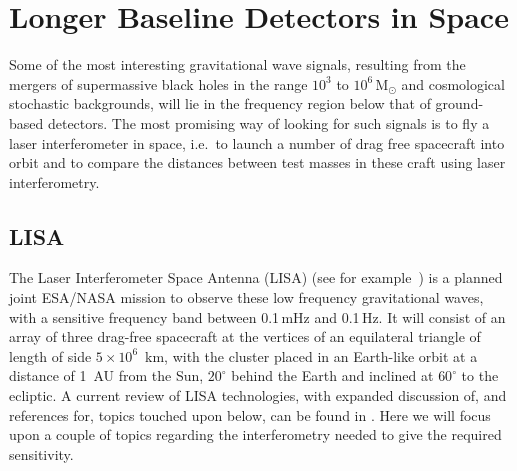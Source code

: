 \documentclass{article}
\begin{document}

\newpage

\section{Longer Baseline Detectors in Space}
\label{section:space}

Some of the most interesting gravitational wave signals, resulting from the
mergers of supermassive black holes in the range $10^3$ to $10^6$\,M$_{\odot}$
and cosmological stochastic backgrounds, will lie in the frequency region below
that of ground-based detectors. The most promising way of looking for such
signals is to fly a laser interferometer in space, i.e.\ to launch a number of
drag free spacecraft into orbit and to compare the distances between test
masses in these craft using laser interferometry.

\subsection{LISA}
The Laser Interferometer Space Antenna (LISA) (see for example~\cite{LISAsymposium,
NASAweb, ESAweb}) is a planned joint ESA/NASA mission to observe these low frequency
gravitational waves, with a sensitive frequency band between 0.1\,mHz and
0.1\,Hz. It will consist of an array of three drag-free spacecraft at the vertices
of an equilateral triangle of length of side $5\times10^6$~km, with the cluster 
placed in an Earth-like orbit at a distance of 1~AU from the Sun,
$20^{\circ}$ behind the Earth and inclined at $60^{\circ}$ to the ecliptic. A
current review of LISA technologies, with expanded discussion of, and references
for, topics touched upon below, can be found in \cite{Jennrich:2009}. Here we
will focus upon a couple of topics regarding the interferometry needed to give
the required sensitivity.
\end{document}
